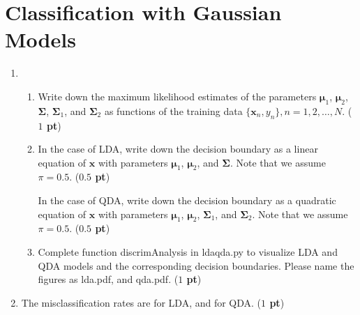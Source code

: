 \documentclass[twoside]{article}
\begin{document}
\section{Classification with Gaussian Models}
\begin{enumerate}
\item
\begin{enumerate}
\item Write down the maximum likelihood estimates of the parameters
$\boldsymbol \mu_{1}$, $\boldsymbol \mu_{2}$, $\boldsymbol \Sigma$,
$\boldsymbol \Sigma_1$, and $\boldsymbol \Sigma_2$ as functions of the training
data $\{\mathbf{x}_n, y_n\}, n=1,2,\ldots,N$. ({\bf $1$ pt})
\begin{center}
   \end{center}

\item In the case of LDA, write down the decision boundary as a linear equation of
$\mathbf{x}$ with parameters $\boldsymbol \mu_{1}$, $\boldsymbol \mu_{2}$, and $\boldsymbol \Sigma$. Note that we assume $\pi=0.5$. ({\bf $0.5$ pt})
\begin{center}
   \end{center}
In the case of QDA, write down the decision boundary as a quadratic equation of
$\mathbf{x}$ with parameters $\boldsymbol \mu_{1}$, $\boldsymbol \mu_{2}$, $\boldsymbol \Sigma_1$, and $\boldsymbol \Sigma_2$. Note that we assume $\pi=0.5$. ({\bf $0.5$ pt})
\begin{center}
   \end{center}

\item Complete function \textsf{discrimAnalysis} in \textsf{ldaqda.py} to
	visualize LDA and QDA models and the corresponding decision boundaries. Please name the figures as \textsf{lda.pdf}, and \textsf{qda.pdf}. ({\bf $1$ pt})

\end{enumerate}
\item The misclassification rates are  for LDA, and  for QDA. ({\bf $1$ pt})
\end{enumerate}
\end{document}
